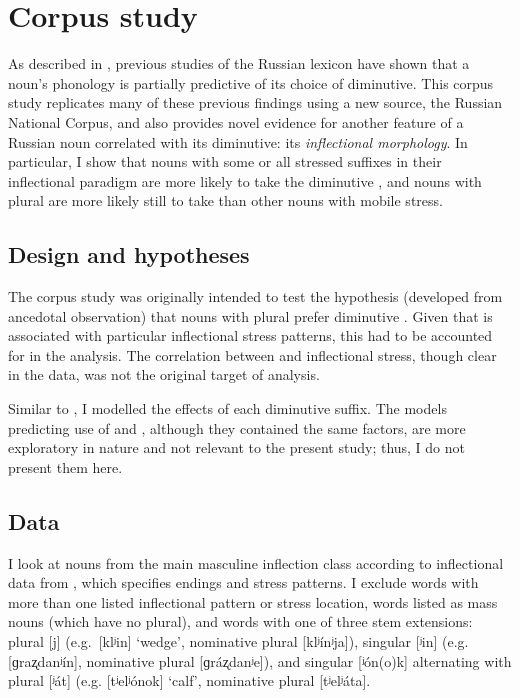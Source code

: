 \documentclass[output=paper,colorlinks,citecolor=brown
]{langscibook}
\begin{document}
\section{Corpus study}\label{sec:corp}
As described in , previous studies of the Russian lexicon have shown that a noun's phonology is partially predictive of its choice of diminutive. This corpus study replicates many of these previous findings using a new source, the Russian National Corpus, and also provides novel evidence for another feature of a Russian noun correlated with its diminutive: its \emph{inflectional morphology}. In particular, I show that nouns with some or all stressed suffixes in their inflectional paradigm are more likely to take the diminutive \ok, and nouns with plural \pla{} are more likely still to take \ok{} than other nouns with mobile stress.

\subsection{Design and hypotheses}\label{sec:corphyp}
The corpus study was originally intended to test the hypothesis (developed from ancedotal observation) that nouns with plural \pla{} prefer diminutive \ok. Given that \pla{} is associated with particular inflectional stress patterns, this had to be accounted for in the analysis. The correlation between \ok{} and inflectional stress, though clear in the data, was not the original target of analysis.

Similar to \citet{Gouskova.etal2015}, I modelled the effects of each diminutive suffix. The models predicting use of \ik{} and \chik, although they contained the same factors, are more exploratory in nature and not relevant to the present study; thus, I do not present them here.

\subsection{Data}\label{sec:corpdata}
I look at nouns from the main masculine inflection class according to inflectional data from \citet{Zaliznjak1977}, which specifies endings and stress patterns. I exclude words with more than one listed inflectional pattern or stress location, words listed as mass nouns (which have no plural), and words with one of three stem extensions: plural [j] (e.g.\ [klʲin] `wedge', nominative plural [klʲínʲja]), singular [ʲin] (e.g. [ɡraʐdanʲín], nominative plural [ɡráʐdanʲe]), and singular [ʲón(o)k] alternating with plural [ʲát] (e.g. [tʲelʲónok] `calf', nominative plural [tʲelʲáta].
\end{document}
